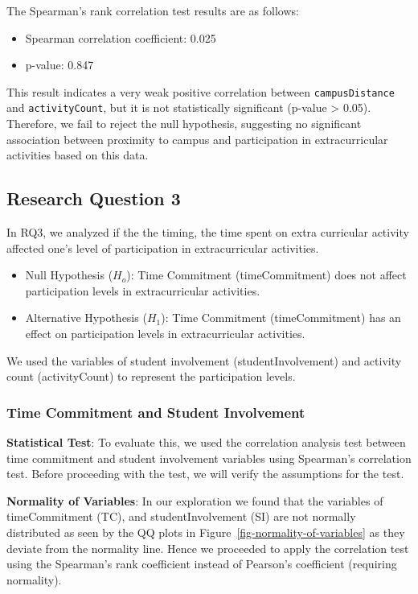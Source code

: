 \documentclass[
  letterpaper,
  DIV=11,
  numbers=noendperiod]{scrartcl}
\providecommand{\tightlist}{%
  \setlength{\itemsep}{0pt}\setlength{\parskip}{0pt}}\usepackage{longtable,booktabs,array}
\begin{document}
The Spearman's rank correlation test results are as follows:

\begin{itemize}
\tightlist
\item
  Spearman correlation coefficient: 0.025
\item
  p-value: 0.847
\end{itemize}

This result indicates a very weak positive correlation between
\texttt{campusDistance} and \texttt{activityCount}, but it is not
statistically significant (p-value \textgreater{} 0.05). Therefore, we
fail to reject the null hypothesis, suggesting no significant
association between proximity to campus and participation in
extracurricular activities based on this data.

\subsection{Research Question 3}\label{research-question-3}

In RQ3, we analyzed if the the timing, the time spent on extra
curricular activity affected one's level of participation in
extracurricular activities.

\begin{itemize}
\tightlist
\item
  Null Hypothesis (\(H_{o}\)): Time Commitment (timeCommitment) does not
  affect participation levels in extracurricular activities.
\item
  Alternative Hypothesis (\(H_{1}\)): Time Commitment (timeCommitment)
  has an effect on participation levels in extracurricular activities.
\end{itemize}

We used the variables of student involvement (studentInvolvement) and
activity count (activityCount) to represent the participation levels.

\subsubsection{Time Commitment and Student
Involvement}\label{time-commitment-and-student-involvement}

\textbf{Statistical Test}: To evaluate this, we used the correlation
analysis test between time commitment and student involvement variables
using Spearman's correlation test. Before proceeding with the test, we
will verify the assumptions for the test.

\textbf{Normality of Variables}: In our exploration we found that the
variables of timeCommitment (TC), and studentInvolvement (SI) are not
normally distributed as seen by the QQ plots in
Figure~\ref{fig-normality-of-variables} as they deviate from the
normality line. Hence we proceeded to apply the correlation test using
the Spearman's rank coefficient instead of Pearson's coefficient
(requiring normality).
\end{document}
